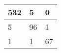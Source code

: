 \begin{tabular}{lll}
\hline
  532 & 5 & 0 \\
\hline
  5 & 96 & 1 \\
\hline
  1 & 1 & 67 \\
\hline
\end{tabular}

